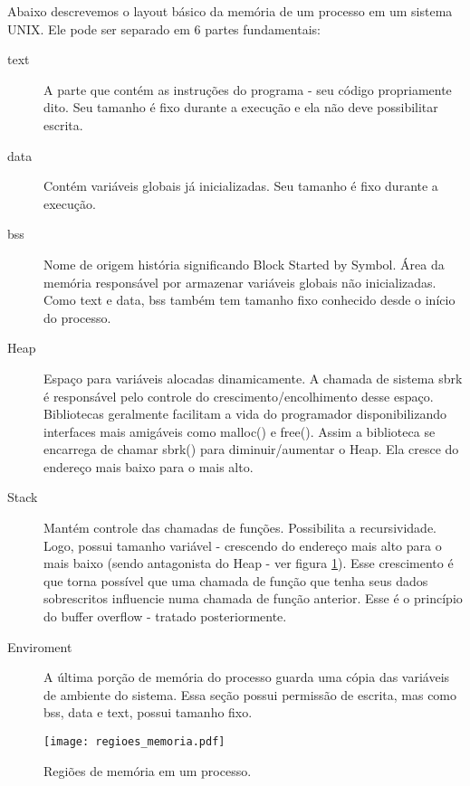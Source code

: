 	Abaixo descrevemos o layout básico da memória de um processo em um sistema UNIX.
	Ele pode ser separado em 6 partes fundamentais:
	\begin{description}
		\item[text]
			A parte que contém as instruções do programa - seu código propriamente dito.
			Seu tamanho é fixo durante a execução e ela não deve possibilitar escrita.
		\item[data]
			Contém variáveis globais já inicializadas. Seu tamanho é fixo durante a execução.
		\item[bss]
			Nome de origem história significando Block Started by Symbol. Área da memória responsável
			por armazenar variáveis globais	não inicializadas. Como text e data, bss também tem tamanho 
			fixo conhecido desde o início do processo. 
		\item[Heap]
			Espaço para variáveis alocadas dinamicamente. A chamada de sistema sbrk é responsável
			pelo controle do crescimento/encolhimento desse espaço. Bibliotecas geralmente facilitam a vida
			do programador disponibilizando interfaces mais amigáveis como malloc() e free(). Assim a biblioteca
			se encarrega de chamar sbrk() para diminuir/aumentar o Heap. Ela cresce do endereço mais baixo para o
			mais alto.
		\item[Stack]
			Mantém controle das chamadas de funções. Possibilita a recursividade. Logo, possui
			tamanho variável - crescendo do endereço mais alto para o mais baixo (sendo antagonista do Heap - ver
			figura \ref{fig:regioes_memoria}). 
			Esse crescimento é que torna possível que uma chamada de função que tenha seus dados
			sobrescritos influencie numa chamada de função anterior. Esse é o princípio do buffer overflow - tratado
			posteriormente.
		\item[Enviroment]
			A última porção de memória do processo guarda uma cópia das variáveis de ambiente do sistema.
			Essa seção possui permissão de escrita, mas como bss, data e text, possui tamanho fixo.
	\end{description}

	\begin{figure}
		\begin{center}
		\texttt{[image: regioes\_memoria.pdf]}
		\caption{Regiões de memória em um processo.}
		\label{fig:regioes_memoria}
		\end{center}
	\end{figure}

